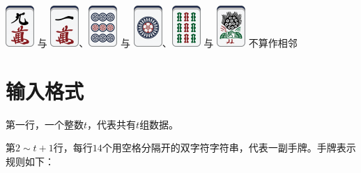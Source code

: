 \documentclass[
	lang=cn,
	color=green
]{elegantbook}
\begin{document}
\begin{remark}
\begin{itemize}
        \includegraphics[scale=0.5]{images/mahjong/9m.png} 与 \includegraphics[scale=0.5]{images/mahjong/1m.png}、\includegraphics[scale=0.5]{images/mahjong/9p.png} 与 \includegraphics[scale=0.5]{images/mahjong/1p.png}、\includegraphics[scale=0.5]{images/mahjong/9s.png} 与 \includegraphics[scale=0.5]{images/mahjong/1s.png} 不算作相邻
    \end{itemize}

\end{remark}


\section*{输入格式}
第一行，一个整数$t$，代表共有$t$组数据。

第$2 \sim t+1$行，每行$14$个用空格分隔开的双字符字符串，代表一副手牌。手牌表示规则如下：
\end{document}
